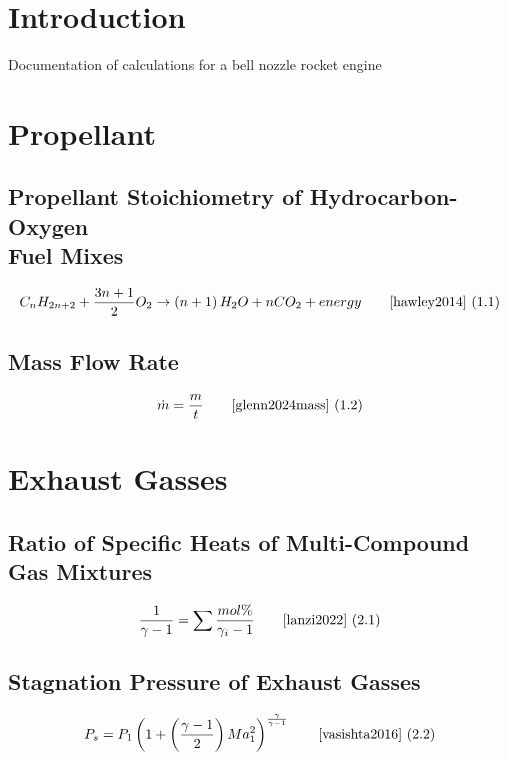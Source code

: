 \documentclass{article}
\newcommand{\eqcite}[3]{\begin{equation}#1\tag*{\text{\cite{#3}~(#2)}}\end{equation}}
\begin{document}
\pagebreak

\section*{Introduction}

Documentation of calculations for a bell nozzle rocket engine

\pagebreak
\section{Propellant}

\subsection[Propellant Stoichiometry]{Propellant Stoichiometry of Hydrocarbon-Oxygen \\ Fuel Mixes}

\eqcite{C_n H_{2n+2} + \frac{3n+1}{2} O_2 \rightarrow \left(n+1\right) H_2O + n CO_2 + energy}{1.1}{hawley2014}

\subsection[Mass Flow Rate]{Mass Flow Rate}

\eqcite{\dot{m}=\frac{m}{t}}{1.2}{glenn2024mass}

\pagebreak
\section{Exhaust Gasses}

\subsection[Ratio of Specific Heats]{Ratio of Specific Heats of Multi-Compound \\Gas Mixtures}

\eqcite{\frac{1}{\gamma-1}=\sum\frac{mol\%}{\gamma_i-1}}{2.1}{lanzi2022}

\subsection[Stagnation Pressure]{Stagnation Pressure of Exhaust Gasses}

\eqcite{P_s=P_1\left(1+\left(\frac{\gamma-1}{2}\right)Ma_1^2\right)^\frac{\gamma}{\gamma-1}}{2.2}{vasishta2016}
\end{document}
